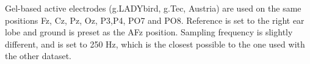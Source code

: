 Gel-based active electrodes (g.LADYbird, g.Tec, Austria) are used on the same positions Fz, Cz, Pz, Oz, P3,P4, PO7 and PO8.  Reference is set to the right ear lobe and ground is preset as the AFz position.   Sampling frequency is slightly different, and is set to 250 Hz, which is the closest possible to the one used with the other dataset.




\begin{figure}[htb]
\centering
{}

\end{figure}

